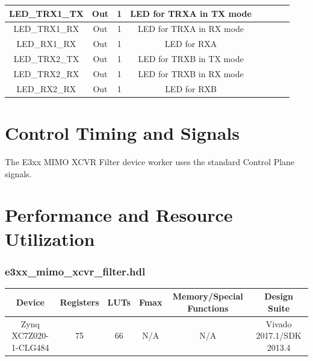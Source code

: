 \documentclass{article}
\def\comp{e3xx\_mimo\_xcvr\_filter}
\begin{document}
\begin{landscape}
\begin{scriptsize}
\begin{tabular}{|c|c|c|c|p{2.6cm}|c|c|c|}
			\hline
			LED\_TRX1\_TX     & Out & 1     & LED for TRXA in TX mode   \\
			\hline
			LED\_TRX1\_RX     & Out & 1     & LED for TRXA in RX mode   \\
			\hline
			LED\_RX1\_RX      & Out & 1     & LED for RXA \\
			\hline
			LED\_TRX2\_TX     & Out & 1     & LED for TRXB in TX mode   \\
			\hline
			LED\_TRX2\_RX     & Out & 1     & LED for TRXB in RX mode   \\
			\hline
			LED\_RX2\_RX      & Out & 1     & LED for RXB \\
			\hline
		\end{tabular}
	\end{scriptsize}
\end{landscape}

\section*{Control Timing and Signals}
The E3xx MIMO XCVR Filter device worker uses the standard Control Plane signals.

\section*{Performance and Resource Utilization}
\subsubsection*{\comp.hdl}
\begin{scriptsize}
	\begin{tabular}{|c|c|c|c|c|c|}
		\hline
		\rowcolor{blue}
		Device             & Registers & LUTs & Fmax        & Memory/Special Functions & Design Suite \\
		\hline
		Zynq XC7Z020-1-CLG484 & 75      & 66  & N/A & N/A                         & Vivado 2017.1/SDK 2013.4    \\
		\hline
	\end{tabular}
\end{scriptsize}
\end{document}
